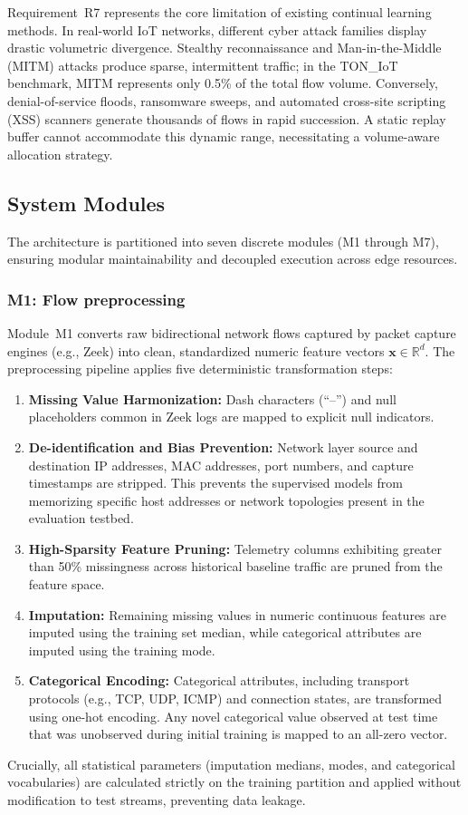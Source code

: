 Requirement~R7 represents the core limitation of existing continual learning methods. In real-world IoT networks, different cyber attack families display drastic volumetric divergence. Stealthy reconnaissance and Man-in-the-Middle (MITM) attacks produce sparse, intermittent traffic; in the TON\_IoT benchmark, MITM represents only 0.5\% of the total flow volume. Conversely, denial-of-service floods, ransomware sweeps, and automated cross-site scripting (XSS) scanners generate thousands of flows in rapid succession. A static replay buffer cannot accommodate this dynamic range, necessitating a volume-aware allocation strategy.

\subsection{System Modules}
\label{subsec:modules}

The architecture is partitioned into seven discrete modules (M1 through M7), ensuring modular maintainability and decoupled execution across edge resources.

\subsubsection{M1: Flow preprocessing}
\label{subsubsec:m1_flow_preprocessing}
Module~M1 converts raw bidirectional network flows captured by packet capture engines (e.g., Zeek) into clean, standardized numeric feature vectors $\mathbf{x} \in \mathbb{R}^d$. The preprocessing pipeline applies five deterministic transformation steps:
\begin{enumerate}
    \item \textbf{Missing Value Harmonization:} Dash characters (``--'') and null placeholders common in Zeek logs are mapped to explicit null indicators.
    \item \textbf{De-identification and Bias Prevention:} Network layer source and destination IP addresses, MAC addresses, port numbers, and capture timestamps are stripped. This prevents the supervised models from memorizing specific host addresses or network topologies present in the evaluation testbed.
    \item \textbf{High-Sparsity Feature Pruning:} Telemetry columns exhibiting greater than 50\% missingness across historical baseline traffic are pruned from the feature space.
    \item \textbf{Imputation:} Remaining missing values in numeric continuous features are imputed using the training set median, while categorical attributes are imputed using the training mode.
    \item \textbf{Categorical Encoding:} Categorical attributes, including transport protocols (e.g., TCP, UDP, ICMP) and connection states, are transformed using one-hot encoding. Any novel categorical value observed at test time that was unobserved during initial training is mapped to an all-zero vector.
\end{enumerate}
Crucially, all statistical parameters (imputation medians, modes, and categorical vocabularies) are calculated strictly on the training partition and applied without modification to test streams, preventing data leakage.

